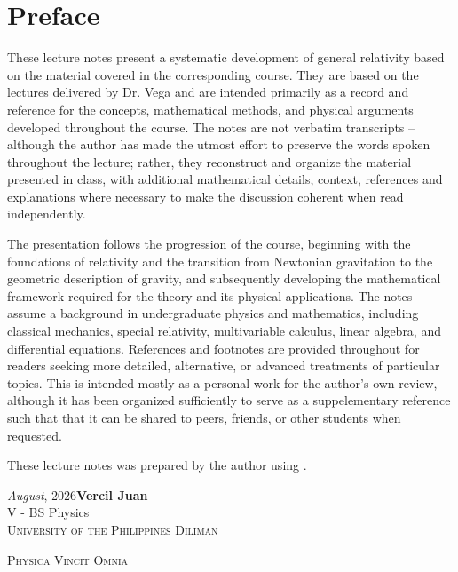 
\section*{Preface}
\vspace{0.5cm}

\hspace{2em}These lecture notes present a systematic development of general relativity based
on the material covered in the corresponding course. They are based on the lectures delivered
by Dr. Vega and are intended primarily as a record and reference for the concepts, mathematical
methods, and physical arguments developed throughout the course. The notes are not verbatim 
transcripts -- although the author has made the utmost effort to preserve the words spoken throughout
the lecture; rather, they reconstruct and organize the material presented in class, with additional
mathematical details, context, references and explanations where necessary to make the discussion 
coherent when read independently. 

The presentation follows the progression of the course, beginning with the foundations of
relativity and the transition from Newtonian gravitation to the geometric description of gravity, 
and subsequently developing the mathematical framework required for the theory and its physical 
applications. The notes assume a background in undergraduate physics and mathematics, including
classical mechanics, special relativity, multivariable calculus, linear algebra, and differential
equations. References and footnotes are provided throughout for readers seeking more detailed, alternative,
or advanced treatments of particular topics. This is intended mostly as a personal work for the author's own
review, although it has been organized sufficiently to serve as a suppelementary reference such that 
that it can be shared to peers, friends, or other students when requested.

These lecture notes was prepared by the author using \LaTeXe.
\begin{flushright}
	\textit{August}, 2026\hfill\textbf{Vercil Juan}\\
	\textrm{V - BS Physics}\\
	\textsc{University of the Philippines Diliman}
\end{flushright}
\vfill
\begin{center}
{\large\textsc{Physica Vincit Omnia}}
\end{center}
